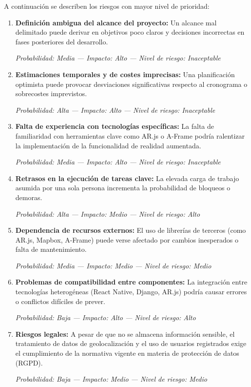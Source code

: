 A continuación se describen los riesgos con mayor nivel de prioridad:

\begin{enumerate}
  \item \textbf{Definición ambigua del alcance del proyecto:} Un alcance mal delimitado puede derivar en objetivos poco claros y decisiones incorrectas en fases posteriores del desarrollo.

  \textit{Probabilidad: Media — Impacto: Alto — Nivel de riesgo: Inaceptable}

  \item \textbf{Estimaciones temporales y de costes imprecisas:} Una planificación optimista puede provocar desviaciones significativas respecto al cronograma o sobrecostes imprevistos.

  \textit{Probabilidad: Alta — Impacto: Alto — Nivel de riesgo: Inaceptable}

  \item \textbf{Falta de experiencia con tecnologías específicas:} La falta de familiaridad con herramientas clave como AR.js o A-Frame podría ralentizar la implementación de la funcionalidad de realidad aumentada.

  \textit{Probabilidad: Media — Impacto: Alto — Nivel de riesgo: Inaceptable}

  \item \textbf{Retrasos en la ejecución de tareas clave:} La elevada carga de trabajo asumida por una sola persona incrementa la probabilidad de bloqueos o demoras.

  \textit{Probabilidad: Alta — Impacto: Medio — Nivel de riesgo: Alto}

  \item \textbf{Dependencia de recursos externos:} El uso de librerías de terceros (como AR.js, Mapbox, A-Frame) puede verse afectado por cambios inesperados o falta de mantenimiento.

  \textit{Probabilidad: Media — Impacto: Medio — Nivel de riesgo: Medio}

  \item \textbf{Problemas de compatibilidad entre componentes:} La integración entre tecnologías heterogéneas (React Native, Django, AR.js) podría causar errores o conflictos difíciles de prever.

  \textit{Probabilidad: Baja — Impacto: Alto — Nivel de riesgo: Alto}

  \item \textbf{Riesgos legales:} A pesar de que no se almacena información sensible, el tratamiento de datos de geolocalización y el uso de usuarios registrados exige el cumplimiento de la normativa vigente en materia de protección de datos (RGPD).

  \textit{Probabilidad: Baja — Impacto: Medio — Nivel de riesgo: Medio}
\end{enumerate}


